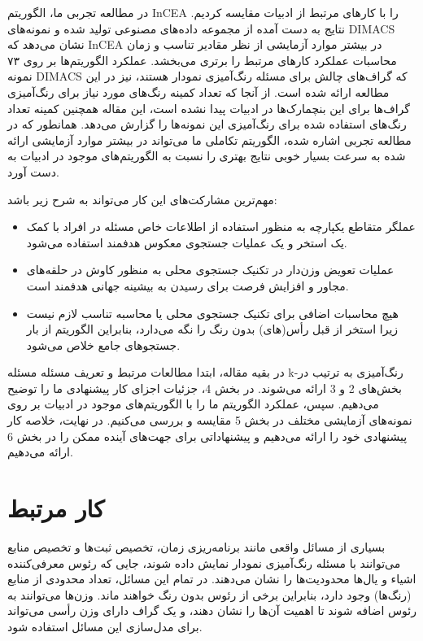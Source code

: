 \documentclass[a4paper,10pt]{article}
\begin{document}
        در مطالعه تجربی ما، الگوریتم InCEA را با کارهای مرتبط از ادبیات مقایسه کردیم. نتایج به دست آمده از مجموعه داده‌های مصنوعی تولید شده و نمونه‌های DIMACS نشان می‌دهد که InCEA در بیشتر موارد آزمایشی از نظر مقادیر تناسب و زمان محاسبات عملکرد کارهای مرتبط را برتری می‌بخشد. عملکرد الگوریتم‌ها بر روی ۷۳ نمونه DIMACS که گراف‌های چالش برای مسئله رنگ‌آمیزی نمودار هستند، نیز در این مطالعه ارائه شده است. از آنجا که تعداد کمینه رنگ‌های مورد نیاز برای رنگ‌آمیزی گراف‌ها برای این بنچمارک‌ها در ادبیات پیدا نشده است، این مقاله همچنین کمینه تعداد رنگ‌های استفاده شده برای رنگ‌آمیزی این نمونه‌ها را گزارش می‌دهد. همانطور که در مطالعه تجربی اشاره شده، الگوریتم تکاملی ما می‌تواند در بیشتر موارد آزمایشی ارائه شده به سرعت بسیار خوبی نتایج بهتری را نسبت به الگوریتم‌های موجود در ادبیات به دست آورد.

        مهم‌ترین مشارکت‌های این کار می‌تواند به شرح زیر باشد:

        \begin{itemize}
            
            \item عملگر متقاطع یکپارچه به منظور استفاده از اطلاعات خاص مسئله در افراد با کمک یک استخر و یک عملیات جستجوی معکوس هدفمند استفاده می‌شود.

            \item عملیات تعویض وزن‌دار در تکنیک جستجوی محلی به منظور کاوش در حلقه‌های مجاور و افزایش فرصت برای رسیدن به بیشینه جهانی هدفمند است.

            \item هیچ محاسبات اضافی برای تکنیک جستجوی محلی یا محاسبه تناسب لازم نیست زیرا استخر از قبل رأس(های) بدون رنگ را نگه می‌دارد، بنابراین الگوریتم از بار جستجوهای جامع خلاص می‌شود.

        \end{itemize}

        در بقیه مقاله، ابتدا مطالعات مرتبط و تعریف مسئله مسئله k-رنگ‌آمیزی به ترتیب در بخش‌های 2 و 3 ارائه می‌شوند. در بخش 4، جزئیات اجزای کار پیشنهادی ما را توضیح می‌دهیم. سپس، عملکرد الگوریتم ما را با الگوریتم‌های موجود در ادبیات بر روی نمونه‌های آزمایشی مختلف در بخش 5 مقایسه و بررسی می‌کنیم. در نهایت، خلاصه کار پیشنهادی خود را ارائه می‌دهیم و پیشنهاداتی برای جهت‌های آینده ممکن را در بخش 6 ارائه می‌دهیم.

    \section{کار مرتبط}

        بسیاری از مسائل واقعی مانند برنامه‌ریزی زمان، تخصیص ثبت‌ها و تخصیص منابع می‌توانند با مسئله رنگ‌آمیزی نمودار نمایش داده شوند، جایی که رئوس معرفی‌کننده اشیاء و یال‌ها محدودیت‌ها را نشان می‌دهند. در تمام این مسائل، تعداد محدودی از منابع (رنگ‌ها) وجود دارد، بنابراین برخی از رئوس بدون رنگ خواهند ماند. وزن‌ها می‌توانند به رئوس اضافه شوند تا اهمیت آن‌ها را نشان دهند، و یک گراف دارای وزن رأسی می‌تواند برای مدل‌سازی این مسائل استفاده شود.
\end{document}
